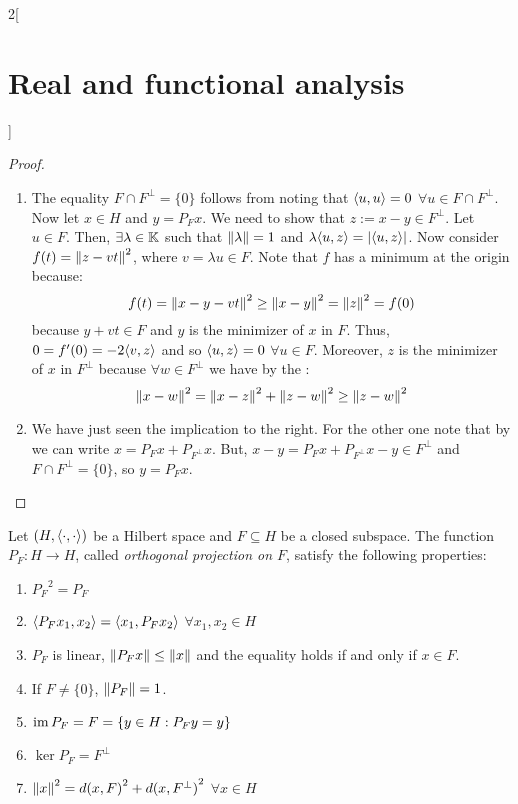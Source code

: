 \documentclass[../../../main_math.tex]{subfiles}
\begin{document}
\begin{multicols}{2}[\section{Real and functional analysis}]
\begin{important}
\begin{theorem}
    \end{theorem}
  \end{important}
  \begin{proof}
    \begin{enumerate}
      \item The equality $F\cap F^\perp=\{0\}$ follows from noting that ${\left\langle u,u\right\rangle}=0$ $\forall u\in F\cap F^\perp$. Now let $x\in H$ and $y=P_Fx$. We need to show that $z:=x-y\in F^\perp$. Let $u\in F$. Then, $\exists\lambda\in\mathbb{K}$ such that $\left\|\lambda\right\|= 1$ and $\lambda{\left\langle u,z\right\rangle}=\abs{{\left\langle u,z\right\rangle}}$. Now consider $f(t)=\left\|z-vt\right\|^2$, where $v=\lambda u\in F$. Note that $f$ has a minimum at the origin because:
            $$f(t)=\left\|x-y -vt\right\|^2\geq\left\|x-y\right\|^2=\left\|z\right\|^2=f(0)$$
            because $y+vt\in F$ and $y$ is the minimizer of  $x$ in $F$. Thus, $0=f'(0)=-2{\left\langle v,z\right\rangle}$ and so ${\left\langle u,z\right\rangle}=0$ $\forall u\in F$. Moreover, $z$ is the minimizer of $x$ in $F^\perp$ because $\forall w\in F^\perp$ we have by the :
            $$\left\|x-w\right\|^2=\left\|x-z\right\|^2+\left\|z-w\right\|^2\geq \left\|z-w\right\|^2$$
      \item We have just seen the implication to the right. For the other one note that by  we can write $x=P_Fx+P_{F^\perp}x$. But, $x-y=P_Fx+P_{F^\perp}x -y\in F^\perp$ and $F\cap F^\perp=\{0\}$, so $y=P_Fx$.
    \end{enumerate}
  \end{proof}
  \begin{corollary}
    Let $(H,{\left\langle\cdot,\cdot\right\rangle})$ be a Hilbert space and $F\subseteq H$ be a closed subspace. The function $P_F:H\rightarrow H$, called \emph{orthogonal projection on $F$}, satisfy the following properties:
    \begin{enumerate}
      \item\label{RFA:corprojA} ${P_F}^2 = P_F$
      \item\label{RFA:corprojB} ${\left\langle P_Fx_1,x_2\right\rangle}={\left\langle x_1,P_Fx_2\right\rangle}$ $\forall x_1, x_2\in H$
      \item\label{RFA:corprojC} $P_F$ is linear, $\left\|P_Fx\right\|\leq \left\|x\right\|$ and the equality holds if and only if $x\in F$.
      \item If $F\ne\{0\}$, $\left\|P_F\right\|=1$.
      \item $\operatorname{im} P_F=F=\{y\in H:P_Fy=y\}$
      \item $\ker P_F=F^\perp$
      \item $\left\|x\right\|^2={d(x,F)}^2+{d(x,F^\perp)}^2$ $\forall x\in H$
    \end{enumerate}

\end{corollary}
\end{multicols}
\end{document}
